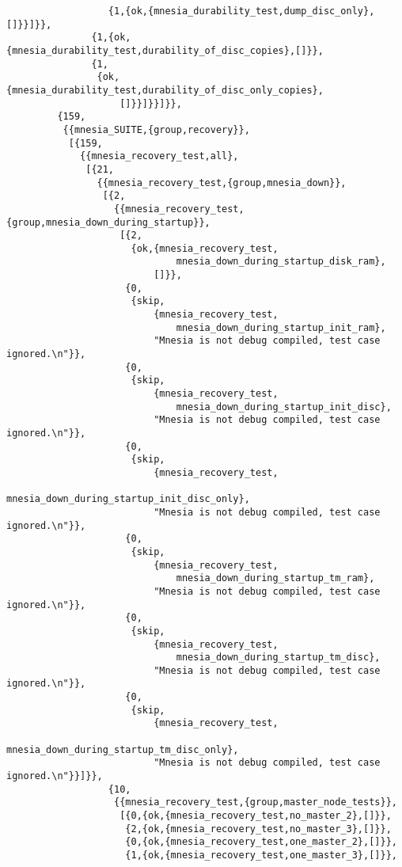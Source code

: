 \begin{verbatim}
                  {1,{ok,{mnesia_durability_test,dump_disc_only},[]}}]}},
               {1,{ok,{mnesia_durability_test,durability_of_disc_copies},[]}},
               {1,
                {ok,{mnesia_durability_test,durability_of_disc_only_copies},
                    []}}]}}]}},
         {159,
          {{mnesia_SUITE,{group,recovery}},
           [{159,
             {{mnesia_recovery_test,all},
              [{21,
                {{mnesia_recovery_test,{group,mnesia_down}},
                 [{2,
                   {{mnesia_recovery_test,{group,mnesia_down_during_startup}},
                    [{2,
                      {ok,{mnesia_recovery_test,
                              mnesia_down_during_startup_disk_ram},
                          []}},
                     {0,
                      {skip,
                          {mnesia_recovery_test,
                              mnesia_down_during_startup_init_ram},
                          "Mnesia is not debug compiled, test case ignored.\n"}},
                     {0,
                      {skip,
                          {mnesia_recovery_test,
                              mnesia_down_during_startup_init_disc},
                          "Mnesia is not debug compiled, test case ignored.\n"}},
                     {0,
                      {skip,
                          {mnesia_recovery_test,
                              mnesia_down_during_startup_init_disc_only},
                          "Mnesia is not debug compiled, test case ignored.\n"}},
                     {0,
                      {skip,
                          {mnesia_recovery_test,
                              mnesia_down_during_startup_tm_ram},
                          "Mnesia is not debug compiled, test case ignored.\n"}},
                     {0,
                      {skip,
                          {mnesia_recovery_test,
                              mnesia_down_during_startup_tm_disc},
                          "Mnesia is not debug compiled, test case ignored.\n"}},
                     {0,
                      {skip,
                          {mnesia_recovery_test,
                              mnesia_down_during_startup_tm_disc_only},
                          "Mnesia is not debug compiled, test case ignored.\n"}}]}},
                  {10,
                   {{mnesia_recovery_test,{group,master_node_tests}},
                    [{0,{ok,{mnesia_recovery_test,no_master_2},[]}},
                     {2,{ok,{mnesia_recovery_test,no_master_3},[]}},
                     {0,{ok,{mnesia_recovery_test,one_master_2},[]}},
                     {1,{ok,{mnesia_recovery_test,one_master_3},[]}},

\end{verbatim}
